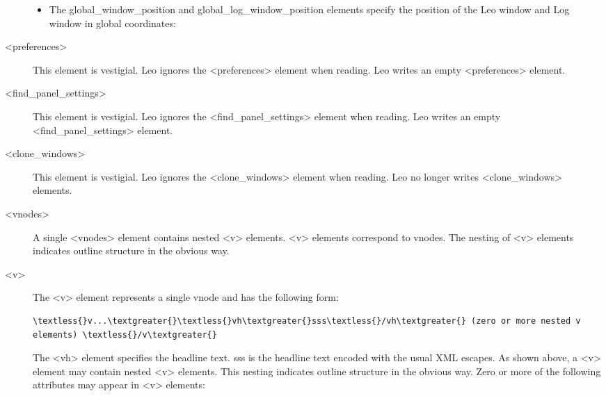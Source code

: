 \documentclass[a4paper,10pt,english]{sphinxmanual}
\begin{document}
\begin{description}
\begin{itemize}
\item {} 
The global\_window\_position and global\_log\_window\_position elements
specify the position of the Leo window and Log window in global coordinates:

\end{itemize}

\item[{\textless{}preferences\textgreater{}}] \leavevmode
This element is vestigial.
Leo ignores the \textless{}preferences\textgreater{} element when reading.
Leo writes an empty \textless{}preferences\textgreater{} element.

\item[{\textless{}find\_panel\_settings\textgreater{}}] \leavevmode
This element is vestigial.
Leo ignores the \textless{}find\_panel\_settings\textgreater{} element when reading.
Leo writes an empty \textless{}find\_panel\_settings\textgreater{} element.

\item[{\textless{}clone\_windows\textgreater{}}] \leavevmode
This element is vestigial.
Leo ignores the \textless{}clone\_windows\textgreater{} element when reading.
Leo no longer writes \textless{}clone\_windows\textgreater{} elements.

\item[{\textless{}vnodes\textgreater{}}] \leavevmode
A single \textless{}vnodes\textgreater{} element contains nested \textless{}v\textgreater{} elements.
\textless{}v\textgreater{} elements correspond to vnodes.
The nesting of \textless{}v\textgreater{} elements indicates outline structure in the obvious way.

\item[{\textless{}v\textgreater{}}] \leavevmode
The \textless{}v\textgreater{} element represents a single vnode and has the following form:

\begin{Verbatim}[commandchars=\\\{\}]
\textless{}v...\textgreater{}\textless{}vh\textgreater{}sss\textless{}/vh\textgreater{} (zero or more nested v elements) \textless{}/v\textgreater{}
\end{Verbatim}

The \textless{}vh\textgreater{} element specifies the headline text.
sss is the headline text encoded with the usual XML escapes.
As shown above, a \textless{}v\textgreater{} element may contain nested \textless{}v\textgreater{} elements.
This nesting indicates outline structure in the obvious way.
Zero or more of the following attributes may appear in \textless{}v\textgreater{} elements:


\end{description}
\end{document}
